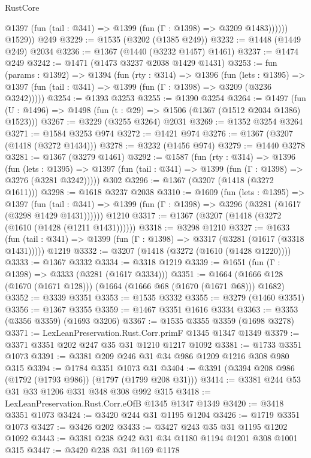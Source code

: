 \begin{lexlean}{RustCore}
\begin{coremodule}
              @1397 (fun (tail : @341) => @1399 (fun (Γ : @1398) => @3209 @1483))))))
        @1529))
    @249
@3229 := @1535 (@3202 (@1385 @249))
@3232 := @1448 (@1449 @249) @2034
@3236 := @1367 (@1440 (@3232 @1457) @1461)
@3237 := @1474 @249
@3242 := @1471 (@1473 @3237 @2038 @1429 @1431)
@3253 := fun (params : @1392) =>
  @1394
    (fun (rty : @314) =>
    @1396
      (fun (lets : @1395) =>
      @1397 (fun (tail : @341) => @1399 (fun (Γ : @1398) => @3209 (@3236 @3242)))))
@3254 := @1393 @3253
@3255 := @1390 @3254
@3264 := @1497 (fun (U : @1496) => @1498 (fun (t : @29) => @1506 (@1367 (@1512 @2034 @1386) @1523)))
@3267 := @3229 (@3255 @3264) @2031
@3269 := @1352 @3254 @3264
@3271 := @1584 @3253 @974
@3272 := @1421 @974
@3276 := @1367 (@3207 (@1418 (@3272 @1434)))
@3278 := @3232 (@1456 @974)
@3279 := @1440 @3278
@3281 := @1367 (@3279 @1461)
@3292 := @1587
    (fun (rty : @314) =>
    @1396
      (fun (lets : @1395) =>
      @1397 (fun (tail : @341) => @1399 (fun (Γ : @1398) => @3276 (@3281 @3242)))))
    @302
@3296 := @1367 (@3207 (@1418 (@3272 @1611)))
@3298 := @1618 @3237 @2038
@3310 := @1609
    (fun (lets : @1395) =>
    @1397
      (fun (tail : @341) => @1399 (fun (Γ : @1398) => @3296 (@3281 (@1617 (@3298 @1429 @1431))))))
    @1210
@3317 := @1367 (@3207 (@1418 (@3272 (@1610 (@1428 (@1211 @1431))))))
@3318 := @3298 @1210
@3327 := @1633
    (fun (tail : @341) => @1399 (fun (Γ : @1398) => @3317 (@3281 (@1617 (@3318 @1431)))))
    @1219
@3332 := @3207 (@1418 (@3272 (@1610 (@1428 @1220))))
@3333 := @1367 @3332
@3334 := @3318 @1219
@3339 := @1651 (fun (Γ : @1398) => @3333 (@3281 (@1617 @3334)))
@3351 := @1664 (@1666 @128 (@1670 (@1671 @128))) (@1664 (@1666 @68 (@1670 (@1671 @68))) @1682)
@3352 := @3339 @3351
@3353 := @1535 @3332
@3355 := @3279 (@1460 @3351)
@3356 := @1367 @3355
@3359 := @1467 @3351 @1616 @3334
@3363 := @3353 (@3356 @3359) (@1693 @3206)
@3367 := @1535 @3355 @3359 (@1698 @3278)
@3371 := LexLeanPreservation.Rust.Corr.primF @1345 @1347 @1349
@3379 := @3371 @3351 @202 @247 @35 @31 @1210 @1217 @1092
@3381 := @1733 @3351 @1073
@3391 := @3381 @209 @246 @31 @34 @986 @1209 @1216 @308 @980 @315
@3394 := @1784 @3351 @1073 @31
@3404 := @3391 (@3394 @208 @986 (@1792 (@1793 @986)) (@1797 (@1799 @208 @31)))
@3414 := @3381 @244 @53 @31 @33 @1206 @331 @348 @308 @992 @315
@3418 := LexLeanPreservation.Rust.Corr.eOfB @1345 @1347 @1349
@3420 := @3418 @3351 @1073
@3424 := @3420 @244 @31 @1195 @1204
@3426 := @1719 @3351 @1073
@3427 := @3426 @202
@3433 := @3427 @243 @35 @31 @1195 @1202 @1092
@3443 := @3381 @238 @242 @31 @34 @1180 @1194 @1201 @308 @1001 @315
@3447 := @3420 @238 @31 @1169 @1178

\end{coremodule}
\end{lexlean}
